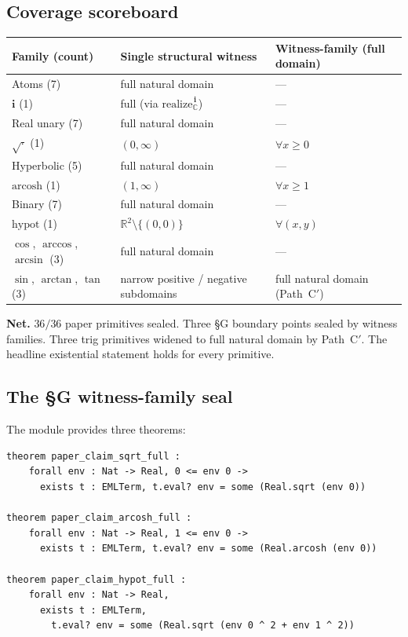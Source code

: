 \documentclass[11pt,a4paper]{article}
\theoremstyle{plain}
\theoremstyle{definition}
\newcommand{\C}{\mathbb{C}}
\newcommand{\R}{\mathbb{R}}
\newcommand{\imu}{\mathbf{i}}
\begin{document}
\subsection{Coverage scoreboard}

\begin{center}
\begin{tabularx}{\textwidth}{@{}l X X@{}}
\toprule
\textbf{Family (count)} & \textbf{Single structural witness}
                        & \textbf{Witness-family (full domain)} \\
\midrule
Atoms (7)                 & full natural domain                   & --- \\
$\imu$ (1)                & full (via $\mathrm{realize}_\C^{\,\imu}$) & --- \\
Real unary (7)            & full natural domain                   & --- \\
$\sqrt{\cdot}$ (1)        & $(0, \infty)$                          & $\forall x \geq 0$ \\
Hyperbolic (5)            & full natural domain                   & --- \\
$\mathrm{arcosh}$ (1)     & $(1, \infty)$                          & $\forall x \geq 1$ \\
Binary (7)                & full natural domain                   & --- \\
$\mathrm{hypot}$ (1)      & $\R^2 \setminus \{(0,0)\}$             & $\forall (x, y)$ \\
$\cos$, $\arccos$, $\arcsin$ (3) & full natural domain & --- \\
$\sin$, $\arctan$, $\tan$ (3) & narrow positive / negative subdomains  & full natural domain (Path~C$'$) \\
\bottomrule
\end{tabularx}
\end{center}

\noindent\textbf{Net.} $36 / 36$ paper primitives sealed. Three §G
boundary points sealed by witness families. Three trig primitives
widened to full natural domain by Path~C$'$. The headline existential
statement holds for every primitive.

\subsection{The §G witness-family seal}\label{sec:gfix}

The module  provides three theorems:

\begin{lstlisting}[language=Lean]
theorem paper_claim_sqrt_full :
    forall env : Nat -> Real, 0 <= env 0 ->
      exists t : EMLTerm, t.eval? env = some (Real.sqrt (env 0))

theorem paper_claim_arcosh_full :
    forall env : Nat -> Real, 1 <= env 0 ->
      exists t : EMLTerm, t.eval? env = some (Real.arcosh (env 0))

theorem paper_claim_hypot_full :
    forall env : Nat -> Real,
      exists t : EMLTerm,
        t.eval? env = some (Real.sqrt (env 0 ^ 2 + env 1 ^ 2))
\end{lstlisting}
\end{document}
